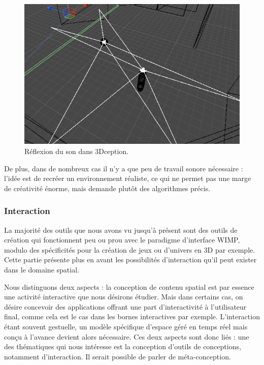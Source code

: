 \documentclass[french,12pt]{article}
\begin{document}
\begin{figure}[h]
    \centering
    \includegraphics[scale=0.5]{images/3Dception.png}
    \caption{Réflexion du son dans 3Dception.}
    \label{fig.3Dception}
\end{figure}

De plus, dans de nombreux cas il n'y a que peu de travail sonore nécessaire : l'idée est de recréer un environnement réaliste, ce qui ne permet pas une marge de créativité énorme, mais demande plutôt des algorithmes précis.

\subsubsection{Interaction}
La majorité des outils que nous avons vu jusqu'à présent sont des outils de création qui fonctionnent peu ou prou avec le paradigme d'interface \ac{WIMP}, modulo des spécificités pour la création de jeux ou d'univers en 3D par exemple. Cette partie présente plus en avant les possibilités d'interaction qu'il peut exister dans le domaine spatial.

Nous distinguons deux aspects : la conception de contenu spatial est par essence une activité interactive que nous désirons étudier. 
Mais dans certains cas, on désire concevoir des applications offrant une part d'interactivité à l'utilisateur final, comme cela est le cas dans les bornes interactives par exemple. 
L'interaction étant souvent gestuelle, un modèle spécifique d'espace géré en temps réel mais conçu à l'avance devient alors nécessaire.
Ces deux aspects sont donc liés : une des thématiques qui nous intéresse est la conception d'outils de conceptions, notamment d'interaction. Il serait possible de parler de méta-conception.
\end{document}
